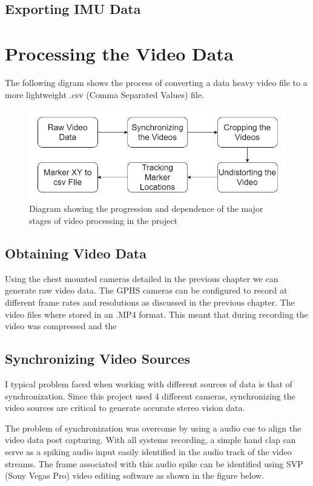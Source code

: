 \subsection{Exporting IMU Data}


\section{Processing the Video Data}
The following digram shows the process of converting a data heavy video file to a more lightweight .csv (Comma Separated Values) file.
\begin{figure}[!ht]
  \includegraphics[width=\linewidth]{figures/videoProcess.png}
  \caption{Diagram showing the progression and dependence of the major stages of video processing in the project}
  \label{fig:videoProcess}
\end{figure}

\subsection{Obtaining Video Data}
Using the chest mounted cameras detailed in the previous chapter we can generate raw video data. The GPHS cameras can be configured to record at different frame rates and resolutions as discussed in the previous chapter. The video files where stored in an .MP4 format. This meant that during recording the video was compressed and the 


\subsection{Synchronizing Video Sources}
I typical problem faced when working with different sources of data is that of synchronization. Since this project used 4 different cameras, synchronizing the video sources are critical to generate accurate stereo vision data.

The problem of synchronization was overcome by using a audio cue to align the video data post capturing. With all systems recording, a simple hand clap can serve as a spiking audio input easily identified in the audio track of the video streams. The frame associated with this audio spike can be identified using SVP (Sony Vegas Pro) video editing software as shown in the figure below. 

